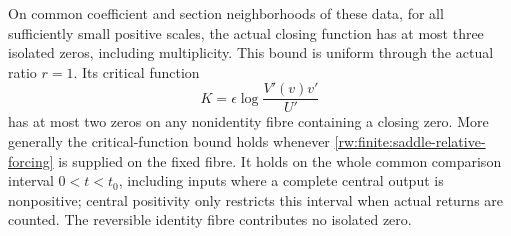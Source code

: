 \begin{proposition}
\label{rw:finite:regular-saddle}
On common coefficient and section neighborhoods of these data, for all
sufficiently small positive scales, the actual closing function has at
most three isolated zeros, including multiplicity. This bound is uniform
through the actual ratio $r=1$. Its critical function
\begin{equation}\label{rw:finite:saddle-critical}
 K=\epsilon\log\frac{V'(v)v'}{U'}
\end{equation}
has at most two zeros on any nonidentity fibre containing a closing
zero. More generally the critical-function bound holds whenever
\eqref{rw:finite:saddle-relative-forcing} is supplied on the fixed
fibre. It holds on the whole common comparison interval $0<t<t_0$,
including inputs where a complete central output is nonpositive;
central positivity only restricts this interval when actual returns
are counted. The reversible identity fibre contributes no isolated zero.
\end{proposition}
